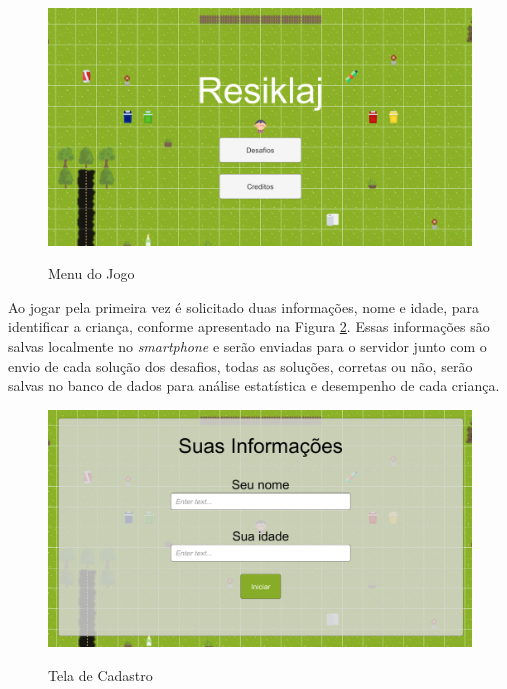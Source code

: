     \begin{figure}[H]
        \caption{Menu do Jogo}
        \centering
        \includegraphics[width=14cm]{Imagens/Cap4/menu_final.png}
        \label{figura:menu_final}
    \end{figure}
    
    Ao jogar pela primeira vez é solicitado duas informações, nome e idade, para identificar a criança, conforme apresentado na Figura \ref{figura:tela_final_cadastro}. Essas informações são salvas localmente no \textit{smartphone} e serão enviadas para o servidor junto com o envio de cada solução dos desafios, todas as soluções, corretas ou não, serão salvas no banco de dados para análise estatística e desempenho de cada criança.
    
    \begin{figure}[H]
        \caption{Tela de Cadastro}
        \centering
        \includegraphics[width=14cm]{Imagens/Cap4/tela_final_cadastro.png}
        \label{figura:tela_final_cadastro}
    \end{figure}
    

